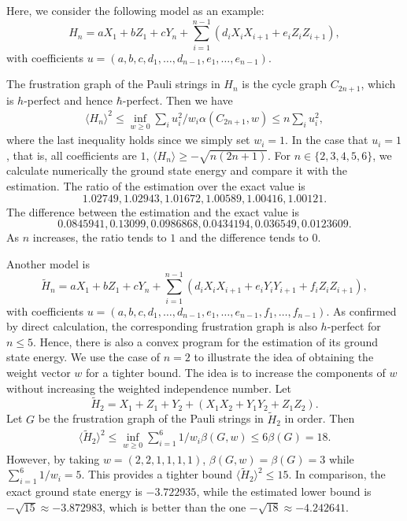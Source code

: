 Here, we consider the following model as an example:
\begin{equation}
H_n =	a X_1+b Z_1 + c Y_{n} + \sum_{i=1}^{n-1}(d_i X_iX_{i+1} + e_i Z_iZ_{i+1}),
\end{equation}
with coefficients $u = (a,b,c,d_1,\ldots,d_{n-1},e_1,\ldots,e_{n-1})$.

The frustration graph of the Pauli strings in $H_n$ is the cycle graph $C_{2n+1}$, which is $h$-perfect and hence $\hbar$-perfect. Then we have
\begin{align}
	\langle H_n \rangle^2 \le \inf_{w\ge 0}\sum_i u_i^2 /w_i \alpha(C_{2n+1},w) \le n\sum_i u_i^2,
\end{align}
where the last inequality holds since we simply set $w_i=1$.
In the case that $u_i=1$, that is, all coefficients are $1$, $\langle H_n\rangle \ge -\sqrt{n(2n+1)}$. 
For $n\in \{2,3,4,5,6\}$, we calculate numerically the ground state energy and compare it with the estimation. The ratio of the estimation over the exact value is
\begin{equation}
1.02749, 1.02943, 1.01672, 1.00589, 1.00416, 1.00121
.\end{equation}
The difference between the estimation and the exact value is
\begin{equation}
0.0845941, 0.13099, 0.0986868, 0.0434194, 0.036549, 0.0123609
.\end{equation}
As $n$ increases, the ratio tends to $1$ and the difference tends to $0$.

Another model is 
\begin{equation}
	\tilde{H}_n =	a X_1+b Z_1 + c Y_{n} + \sum_{i=1}^{n-1}(d_i X_iX_{i+1} + e_i Y_iY_{i+1} + f_i Z_iZ_{i+1}),
\end{equation}
with coefficients $u = (a,b,c,d_1,\ldots,d_{n-1},e_1,\ldots,e_{n-1},f_1,\ldots,f_{n-1})$.
As confirmed by direct calculation, the corresponding frustration graph is also $h$-perfect for $n\le 5$. Hence, there is also a convex program for the estimation of its ground state energy. We use the case of $n=2$ to illustrate the idea of obtaining the weight vector $w$ for a tighter bound. The idea is to increase the components of $w$ without increasing the weighted independence number. 
Let
\begin{equation}
	\tilde{H}_2 = X_1 + Z_1 + Y_2 + \left( X_1X_2 + Y_1Y_2 + Z_1Z_2 \right).
\end{equation}
Let $G$ be the frustration graph of the Pauli strings in $\tilde{H}_2$ in order.
Then
\begin{align}
	\langle \tilde{H}_2\rangle^2 \le \inf_{w\ge 0} \sum_{i=1}^6 1/w_i \beta(G,w) \le 6 \beta(G) = 18.
    \end{align}
However, by taking $w=(2,2,1,1,1,1)$, $\beta(G,w) = \beta(G)=3$ while $\sum_{i=1}^6 1 /w_i = 5$. This provides a tighter bound $\langle \tilde{H}_2\rangle^2 \le 15$. In comparison, the exact ground state energy is $-3.722935$, while the estimated lower bound is $-\sqrt{15} \approx -3.872983$, which is better than the one $-\sqrt{18} \approx -4.242641$. 

